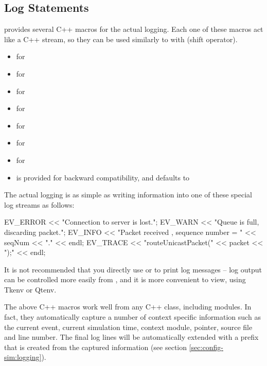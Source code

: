 \subsection{Log Statements}
\label{sec:sim-lib:log-statements}

{\opp} provides several C++ macros for the actual logging. Each one of these
macros act like a C++ stream, so they can be used similarly to 
with  (shift operator).

\begin{itemize}
  \item {} for 
  \item {} for 
  \item {} for 
  \item {} for 
  \item {} for 
  \item {} for 
  \item {} for 
  \item {} is provided for backward compatibility, and defaults to 
\end{itemize}

The actual logging is as simple as writing information into one of these special
log streams as follows:

\begin{cpp}
EV_ERROR << "Connection to server is lost.\n";
EV_WARN << "Queue is full, discarding packet.\n";
EV_INFO << "Packet received , sequence number = " << seqNum << "." << endl;
EV_TRACE << "routeUnicastPacket(" << packet << ");" << endl;
\end{cpp}

\begin{note}
It is not recommended that you directly use  or 
to print log messages -- log output can be controlled more easily from
, and it is more convenient to view, using Tkenv or Qtenv.
\end{note}

The above C++ macros work well from any C++ class, including {\opp} modules. In
fact, they automatically capture a number of context specific information such
as the current event, current simulation time, context module, 
pointer, source file and line number. The final log lines will be automatically
extended with a prefix that is created from the captured information (see
section \ref{sec:config-sim:logging}).


